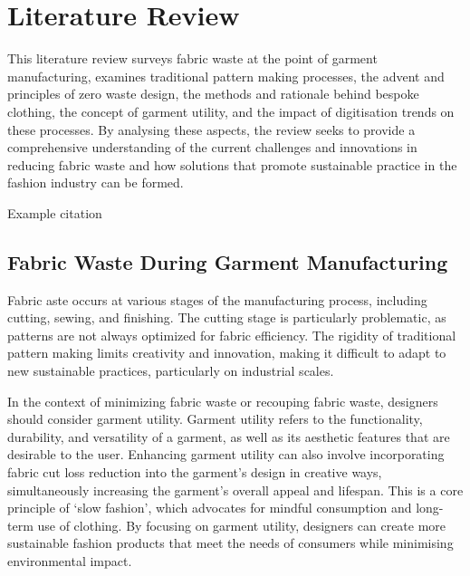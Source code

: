 \chapter{Literature Review}
This literature review surveys fabric waste at the point of garment manufacturing, examines traditional pattern making processes, the advent and principles of zero waste design, the methods and rationale behind bespoke clothing, the concept of garment utility, and the impact of digitisation trends on these processes. By analysing these aspects, the review seeks to provide a comprehensive understanding of the current challenges and innovations in reducing fabric waste and how solutions that promote sustainable practice in the fashion industry can be formed. 

Example citation \cite{aldrich_metric_2015}

\section{Fabric Waste During Garment Manufacturing}
Fabric aste occurs at various stages of the manufacturing process, including cutting, sewing, and finishing. The cutting stage is particularly problematic, as patterns are not always optimized for fabric efficiency. The rigidity of traditional pattern making limits creativity and innovation, making it difficult to adapt to new sustainable practices, particularly on industrial scales.

In the context of minimizing fabric waste or recouping fabric waste, designers should consider garment utility. Garment utility refers to the functionality, durability, and versatility of a garment, as well as its aesthetic features that are desirable to the user. Enhancing garment utility can also involve incorporating fabric cut loss reduction into the garment’s design in creative ways, simultaneously increasing the garment’s overall appeal and lifespan. This is a core principle of ‘slow fashion’, which advocates for mindful consumption and long-term use of clothing. By focusing on garment utility, designers can create more sustainable fashion products that meet the needs of consumers while minimising environmental impact.

